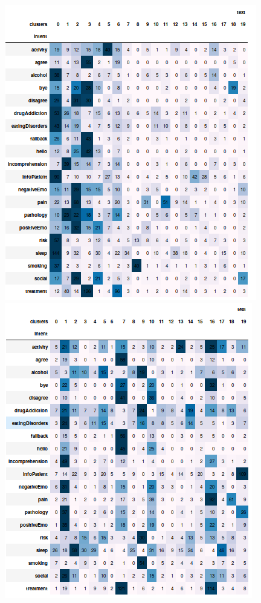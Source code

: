 \documentclass[11pt]{article}
\begin{document}
\begin{figure}[h]
	\centering
	\includegraphics[scale=0.28]{lda_ac_cm.png}
	\includegraphics[scale=0.28]{lda_gm_cm.png}

\end{figure}
\end{document}
